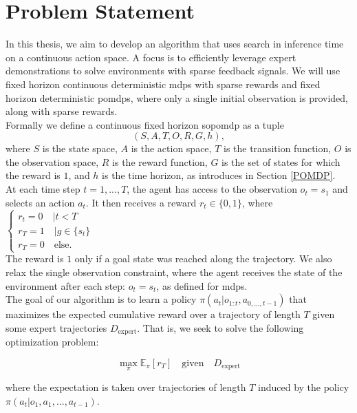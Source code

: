 \chapter{Problem Statement}
\label{chapter:Problem}
In this thesis, we aim to develop an algorithm that uses search in inference time on a continuous action space. 
A focus is to efficiently leverage expert demonstrations to solve environments with sparse feedback signals. We will use fixed horizon continuous 
deterministic \ac{mdp}s with sparse rewards and fixed horizon deterministic \ac{pomdp}s, where only a single initial observation is provided, along with sparse rewards. \\

Formally we define a continuous fixed horizon \ac{sopomdp} as a tuple
$$( S,A,T,O,R,G, h ),$$
where $S$ is the state space, $A$ is the action space, $T$ is the transition 
function, $O$ is the observation space, $R$ is the reward function, $G$ is the set of states for which the reward is $1$, and $h$ is the time horizon, as introduces in Section \ref{POMDP}.\\ 
At each time step $t=1,...,T$, the agent has access to the observation $o_t = s_1$ and selects an action $a_t$.  
It then receives a 
reward $r_t\in \{0,1\}$, where 
$\begin{cases}
    r_t = 0 \quad  |t < T\\
    r_T = 1 \quad  |g \in \{ s_t \}\\
    r_T = 0 \quad \text{else.}
\end{cases}$ \\
The reward is $1$ only if a goal state was reached along the trajectory. We also relax the single 
observation constraint, where the agent receives the state of the environment after each step: $o_t = s_t$, as defined for \ac{mdp}s.\\

The goal of our algorithm is to learn a policy $\pi(a_t|o_{1:t}, a_{0,...,t-1})$ that maximizes the expected cumulative reward over a trajectory of length $T$ given 
some expert trajectories $D_{\text{expert}}$. 
That is, we seek to solve the following optimization problem:

\begin{equation}
\max_{\pi} \mathbb{E}_{\pi}[r_T]\quad \text{given}\quad D_{\text{expert}}
\end{equation}

where the expectation is taken over trajectories of length $T$ induced by the policy\\ $\pi(a_t|o_1, a_1, ..., a_{t-1})$.\\

